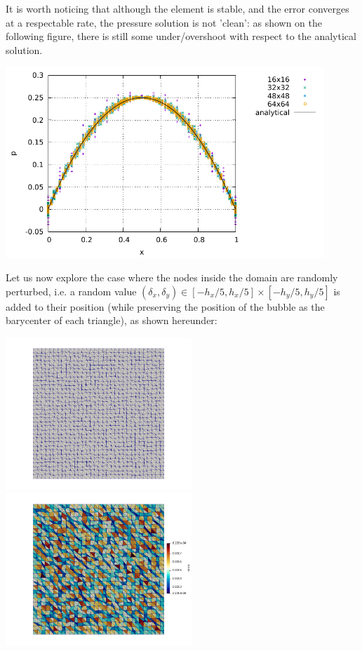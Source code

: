 It is worth noticing that although the element is stable, and the error converges
at a respectable rate, the pressure solution is not 'clean': as shown on the 
following figure, there is still some under/overshoot with respect to the analytical solution.

\begin{center}
\includegraphics[width=12cm]{python_codes/fieldstone_47/images/reg/pressure.pdf}
\end{center}

Let us now explore the case where the nodes inside the domain are randomly perturbed, i.e. 
a random value  $(\delta_x,\delta_y)\in[-h_x/5,h_x/5]\times[-h_y/5,h_y/5]$ is added 
to their position (while preserving the position of the bubble as the barycenter of each triangle), 
as shown hereunder:

\begin{center}
\includegraphics[width=7cm]{python_codes/fieldstone_47/images/rand/grid}
\includegraphics[width=7cm]{python_codes/fieldstone_47/images/rand/areas}
\end{center}
 
